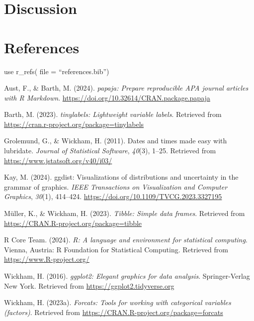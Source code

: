 \documentclass[
  man,floatsintext]{apa6}
\newlength{\cslhangindent}
\newenvironment{CSLReferences}[2] %
 {\begin{list}{}{%
  \setlength{\itemindent}{0pt}
  \setlength{\leftmargin}{0pt}
  \setlength{\parsep}{0pt}
  \ifodd #1
   \setlength{\leftmargin}{\cslhangindent}
   \setlength{\itemindent}{-1\cslhangindent}
  \fi
  \setlength{\itemsep}{#2\baselineskip}}}
 {\end{list}}
\begin{document}
\section{Discussion}\label{discussion}

\newpage

\section{References}\label{references}

use r\_refs( file = ``references.bib'')

\label{refs}
\begin{CSLReferences}{1}{0}
Aust, F., \& Barth, M. (2024). \emph{{papaja}: {Prepare} reproducible {APA} journal articles with {R Markdown}}. \url{https://doi.org/10.32614/CRAN.package.papaja}

Barth, M. (2023). \emph{{tinylabels}: Lightweight variable labels}. Retrieved from \url{https://cran.r-project.org/package=tinylabels}

Grolemund, G., \& Wickham, H. (2011). Dates and times made easy with {lubridate}. \emph{Journal of Statistical Software}, \emph{40}(3), 1--25. Retrieved from \url{https://www.jstatsoft.org/v40/i03/}

Kay, M. (2024). {ggdist}: Visualizations of distributions and uncertainty in the grammar of graphics. \emph{IEEE Transactions on Visualization and Computer Graphics}, \emph{30}(1), 414--424. \url{https://doi.org/10.1109/TVCG.2023.3327195}

Müller, K., \& Wickham, H. (2023). \emph{Tibble: Simple data frames}. Retrieved from \url{https://CRAN.R-project.org/package=tibble}

R Core Team. (2024). \emph{R: A language and environment for statistical computing}. Vienna, Austria: R Foundation for Statistical Computing. Retrieved from \url{https://www.R-project.org/}

Wickham, H. (2016). \emph{ggplot2: Elegant graphics for data analysis}. Springer-Verlag New York. Retrieved from \url{https://ggplot2.tidyverse.org}

Wickham, H. (2023a). \emph{Forcats: Tools for working with categorical variables (factors)}. Retrieved from \url{https://CRAN.R-project.org/package=forcats}


\end{CSLReferences}
\end{document}
